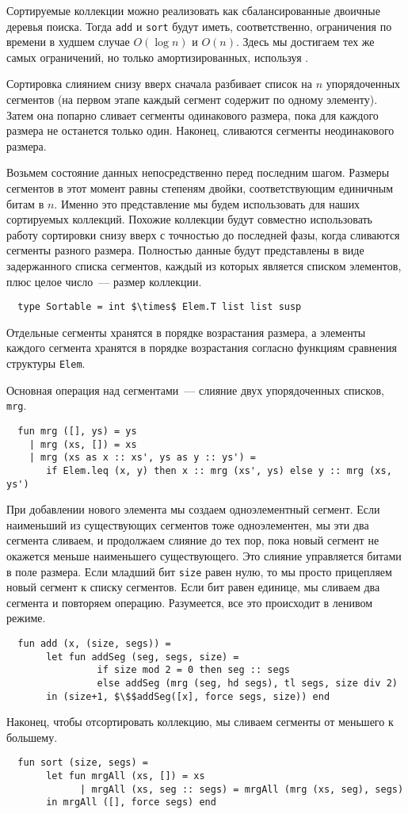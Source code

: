 Сортируемые коллекции можно реализовать как сбалансированные двоичные
деревья поиска. Тогда \lstinline!add! и \lstinline!sort! будут иметь,
соответственно, ограничения по времени в худшем случае $O(\log n)$ и
$O(n)$. Здесь мы достигаем тех же самых ограничений, но только
амортизированных, используя .

Сортировка слиянием снизу вверх сначала разбивает список на $n$
упорядоченных сегментов (на первом этапе каждый сегмент содержит по
одному элементу). Затем она попарно сливает сегменты одинакового
размера, пока для каждого размера не останется только один. Наконец,
сливаются сегменты неодинакового размера.

Возьмем состояние данных непосредственно перед последним
шагом. Размеры сегментов в этот момент равны степеням двойки,
соответствующим единичным битам в $n$.  Именно это представление мы
будем использовать для наших сортируемых коллекций.  Похожие коллекции
будут совместно использовать работу сортировки снизу вверх с точностью
до последней фазы, когда сливаются сегменты разного размера.
Полностью данные будут представлены в виде задержанного списка
сегментов, каждый из которых является списком элементов, плюс целое
число~--- размер коллекции.
\begin{lstlisting}
  type Sortable = int $\times$ Elem.T list list susp
\end{lstlisting}
Отдельные сегменты хранятся в порядке возрастания размера, а элементы
каждого сегмента хранятся в порядке возрастания согласно функциям
сравнения структуры \lstinline!Elem!.

Основная операция над сегментами~--- слияние двух упорядоченных
списков, \lstinline{mrg}.
\begin{lstlisting}
  fun mrg ([], ys) = ys
    | mrg (xs, []) = xs
    | mrg (xs as x :: xs', ys as y :: ys') =
       if Elem.leq (x, y) then x :: mrg (xs', ys) else y :: mrg (xs, ys')
\end{lstlisting}
При добавлении нового элемента мы создаем одноэлементный сегмент. Если
наименьший из существующих сегментов тоже одноэлементен, мы эти два
сегмента сливаем, и продолжаем слияние до тех пор, пока новый сегмент
не окажется меньше наименьшего существующего. Это слияние управляется
битами в поле размера. Если младший бит \lstinline!size! равен нулю, то
мы просто прицепляем новый сегмент к списку сегментов. Если бит равен
единице, мы сливаем два сегмента и повторяем операцию. Разумеется, все
это происходит в ленивом режиме.
\begin{lstlisting}
  fun add (x, (size, segs)) =
       let fun addSeg (seg, segs, size) =
                if size mod 2 = 0 then seg :: segs
                else addSeg (mrg (seg, hd segs), tl segs, size div 2)
       in (size+1, $\$$addSeg([x], force segs, size)) end
\end{lstlisting}
Наконец, чтобы отсортировать коллекцию, мы сливаем сегменты от
меньшего к большему.
\begin{lstlisting}
  fun sort (size, segs) =
       let fun mrgAll (xs, []) = xs
             | mrgAll (xs, seg :: segs) = mrgAll (mrg (xs, seg), segs)
       in mrgAll ([], force segs) end
\end{lstlisting}

